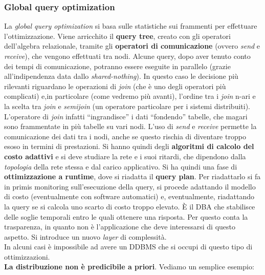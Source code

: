 \documentclass[a4paper,12pt, oneside]{book}
\begin{document}
\subsubsection{Global query optimization}
La \textit{global query optimization} si basa sulle statistiche sui frammenti
per effettuare l'ottimizzazione. Viene arricchito il \textbf{query tree}, creato
con gli operatori dell'algebra relazionale, tramite gli \textbf{operatori di
  comunicazione} (ovvero \textit{send} e \textit{receive}), che vengono
effettuati tra nodi. Alcune query, dopo aver tenuto conto dei tempi di
comunicazione, potranno essere eseguite in parallelo (grazie all'indipendenza
data dallo \textit{shared-nothing}). In questo caso le decisione più rilevanti
riguardano le operazioni di \textit{join} (che è uno degli operatori più
complicati) e,in particolare (come vedremo più avanti), l'ordine tra i
\textit{join} n-ari e la scelta tra \textit{join} e \textit{semijoin} (un
operatore particolare per i sistemi distribuiti). L'operatore di \textit{join}
infatti ``ingrandisce'' i dati ``fondendo'' tabelle, che magari sono frammentate
in più tabelle su vari nodi. L'uso di \textit{send} e \textit{receive} permette
la comunicazione dei dati tra i nodi, anche se questo rischia di diventare
troppo esoso in termini di prestazioni. Si hanno quindi degli \textbf{algoritmi
  di calcolo del costo adattivi} e si deve studiare la rete e i suoi
ritardi, che dipendono dalla \textit{topologia} della rete stessa e dal carico
applicativo. Si ha quindi una fase di \textbf{ottimizzazione a runtime}, dove si
riadatta il \textbf{query plan}. Per riadattarlo si fa in primis monitoring
sull'esecuzione della query, si procede adattando il modello di costo
(eventualmente con software automatici) e, eventualmente, riadattando la query
se si calcola uno scarto di costo troppo elevato. È il DBA che stabilisce delle
soglie temporali entro le quali ottenere una risposta. Per questo conta la
trasparenza, in quanto non è l'applicazione che deve interessarsi di questo
aspetto. Si introduce un nuovo \textit{layer} di complessità.\\
In alcuni casi è impossibile ad avere un DDBMS che si occupi di questo tipo di
ottimizzazioni.\\
\textbf{La distribuzione non è predicibile a priori}.
Vediamo un semplice esempio:
\end{document}
